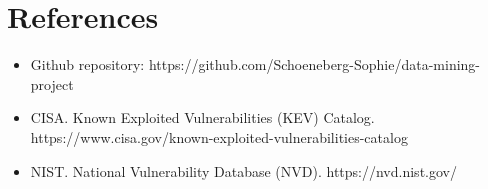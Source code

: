 \documentclass[11pt, a4paper]{article}
\begin{document}
	\section*{References}
	\begin{itemize}
		\item Github repository: https://github.com/Schoeneberg-Sophie/data-mining-project
		\item CISA. Known Exploited Vulnerabilities (KEV) Catalog. https://www.cisa.gov/known-exploited-vulnerabilities-catalog
		\item NIST. National Vulnerability Database (NVD). https://nvd.nist.gov/
	\end{itemize}
	
\end{document}
